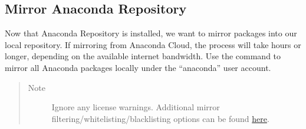 \documentclass[letterpaper,10pt,openany,oneside]{sphinxmanual}
\begin{document}
\subsection{Mirror Anaconda Repository}
\label{AnacondaRepository:mirror-anaconda-repository}
Now that Anaconda Repository is installed, we want to mirror packages into our
local repository. If mirroring from Anaconda Cloud, the process will
take hours or longer, depending on the available internet bandwidth. Use
the  command to mirror all Anaconda
packages locally under the ``anaconda'' user account.
\begin{quote}\begin{description}
\item[{Note}] \leavevmode
Ignore any license warnings. Additional mirror filtering/whitelisting/blacklisting options can be found \href{https://docs.continuum.io/anaconda-repository/mirrors-sync-configuration}{here}.

\end{description}\end{quote}
\end{document}
